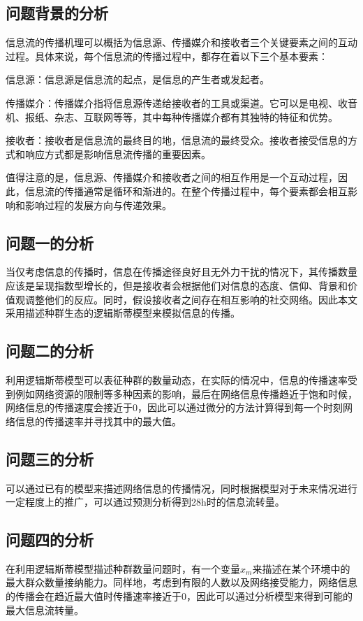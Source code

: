 \documentclass[UTF8]{ctexart}
\begin{document}
\subsection{问题背景的分析}
信息流的传播机理可以概括为信息源、传播媒介和接收者三个关键要素之间的互动过程。具体来说，每个信息流的传播过程中，都存在着以下三个基本要素：\par
信息源：信息源是信息流的起点，是信息的产生者或发起者。\par
传播媒介：传播媒介指将信息源传递给接收者的工具或渠道。它可以是电视、收音机、报纸、杂志、互联网等等，其中每种传播媒介都有其独特的特征和优势。\par
接收者：接收者是信息流的最终目的地，信息流的最终受众。接收者接受信息的方式和响应方式都是影响信息流传播的重要因素。\par
值得注意的是，信息源、传播媒介和接收者之间的相互作用是一个互动过程，因此，信息流的传播通常是循环和渐进的。在整个传播过程中，每个要素都会相互影响和影响过程的发展方向与传递效果。\par
\subsection{问题一的分析}
当仅考虑信息的传播时，信息在传播途径良好且无外力干扰的情况下，其传播数量应该是呈现指数型增长的，但是接收者会根据他们对信息的态度、信仰、背景和价值观调整他们的反应。同时，假设接收者之间存在相互影响的社交网络。因此本文采用描述种群生态的逻辑斯蒂模型来模拟信息的传播。\par
\subsection{问题二的分析}
利用逻辑斯蒂模型可以表征种群的数量动态，在实际的情况中，信息的传播速率受到例如网络资源的限制等多种因素的影响，最后在网络信息传播趋近于饱和时候，网络信息的传播速度会接近于0，因此可以通过微分的方法计算得到每一个时刻网络信息的传播速率并寻找其中的最大值。\par
\subsection{问题三的分析}
可以通过已有的模型来描述网络信息的传播情况，同时根据模型对于未来情况进行一定程度上的推广，可以通过预测分析得到28h时的信息流转量。\par
\subsection{问题四的分析}
在利用逻辑斯蒂模型描述种群数量问题时，有一个变量$x_m$来描述在某个环境中的最大群众数量接纳能力。同样地，考虑到有限的人数以及网络接受能力，网络信息的传播会在趋近最大值时传播速率接近于0，因此可以通过分析模型来得到可能的最大信息流转量。\par
\end{document}
